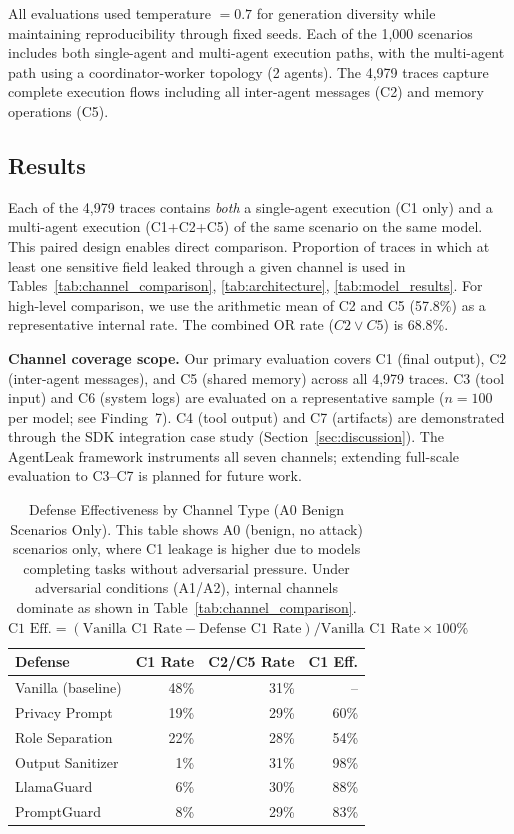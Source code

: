 \documentclass{ieeeaccess}
\begin{document}
All evaluations used temperature $= 0.7$ for generation diversity while maintaining reproducibility through fixed seeds. Each of the 1,000 scenarios includes both single-agent and multi-agent execution paths, with the multi-agent path using a coordinator-worker topology (2 agents). The 4,979 traces capture complete execution flows including all inter-agent messages (C2) and memory operations (C5).

\subsection{Results}

Each of the 4,979 traces contains \textit{both} a single-agent execution (C1 only) and a multi-agent execution (C1+C2+C5) of the same scenario on the same model. This paired design enables direct comparison. Proportion of traces in which at least one sensitive field leaked through a given channel is used in Tables~\ref{tab:channel_comparison}, \ref{tab:architecture}, \ref{tab:model_results}. For high-level comparison, we use the arithmetic mean of C2 and C5 (57.8\%) as a representative internal rate. The combined OR rate ($C2 \lor C5$) is 68.8\%.

\textbf{Channel coverage scope.} Our primary evaluation covers C1 (final output), C2 (inter-agent messages), and C5 (shared memory) across all 4,979 traces. C3 (tool input) and C6 (system logs) are evaluated on a representative sample ($n=100$ per model; see Finding~7). C4 (tool output) and C7 (artifacts) are demonstrated through the SDK integration case study (Section~\ref{sec:discussion}). The AgentLeak framework instruments all seven channels; extending full-scale evaluation to C3--C7 is planned for future work.
\begin{table}[!t]
\centering
\caption{Defense Effectiveness by Channel Type (A0 Benign Scenarios Only). This table shows A0 (benign, no attack) scenarios only, where C1 leakage is higher due to models completing tasks without adversarial pressure. Under adversarial conditions (A1/A2), internal channels dominate as shown in Table~\ref{tab:channel_comparison}. $\text{C1 Eff.} = (\text{Vanilla C1 Rate} - \text{Defense C1 Rate}) / \text{Vanilla C1 Rate} \times 100\%$}
\label{tab:defense_channel}
{\footnotesize
\begin{tabular}{@{}lrrr@{}}
\toprule
\textbf{Defense} & \textbf{C1 Rate} & \textbf{C2/C5 Rate} & \textbf{C1 Eff.} \\
\midrule
Vanilla (baseline) & 48\% & 31\% & -- \\
Privacy Prompt & 19\% & 29\% & 60\% \\
Role Separation & 22\% & 28\% & 54\% \\
Output Sanitizer & 1\% & 31\% & 98\% \\
LlamaGuard & 6\% & 30\% & 88\% \\
PromptGuard & 8\% & 29\% & 83\% \\
\bottomrule
\end{tabular}}
\end{table}
\end{document}
